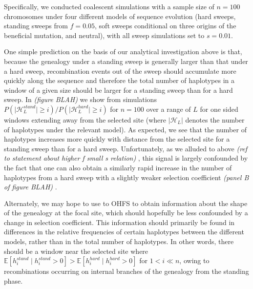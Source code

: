 \documentclass[a4paper,10pt]{article}
\newcommand{\jb}[1]{{\it\color{blue} (#1)} }
\begin{document}
Specifically, we conducted coalescent simulations with a sample size of $n=100$ chromosomes under four different models of sequence evolution (hard sweeps, standing sweeps from $f=0.05$, soft sweeps conditional on three origins of the beneficial mutation, and neutral), with all sweep simulations set to $s=0.01$. 

One simple prediction on the basis of our analytical investigation above is that, because the genealogy under a standing sweep is generally larger than that under a hard sweep, recombination events out of the sweep should accumulate more quickly along the sequence and therefore the total number of haplotypes in a window of a given size should be larger for a standing sweep than for a hard sweep. In \jb{figure BLAH} we show from simulations $P\left(\lvert \mathcal{H}_L^{stand} \rvert \geq i \right)/P\left(\lvert \mathcal{H}_L^{hard} \rvert \geq i \right)$ for $n = 100$ over a range of $L$ for one sided windows extending away from the selected site (where $\lvert \mathcal{H}_L \rvert$ denotes the number of haplotypes under the relevant model). As expected, we see that the number of haplotypes increases more quickly with distance from the selected site for a standing sweep than for a hard sweep. Unfortunately, as we alluded to above \jb{ref to statement about higher f small s relation}, this signal is largely confounded by the fact that one can also obtain a similarly rapid increase in the number of haplotypes from a hard sweep with a slightly weaker selection coefficient \jb{panel B of figure BLAH}.

Alternately, we may hope to use to OHFS to obtain information about the shape of the genealogy at the focal site, which should hopefully be less confounded by a change in selection coefficient. This information should primarily be found in differences in the relative frequencies of certain haplotypes between the different models, rather than in the total number of haplotypes. In other words, there should be a window near the selected site where $\mathbb{E}[h_i^{stand} \mid h_i^{stand} > 0] > \mathbb{E}[h_i^{hard} \mid h_i^{hard} > 0]$ for $1 < i \ll n$, owing to recombinations occurring on internal branches of the genealogy from the standing phase. 
\end{document}
